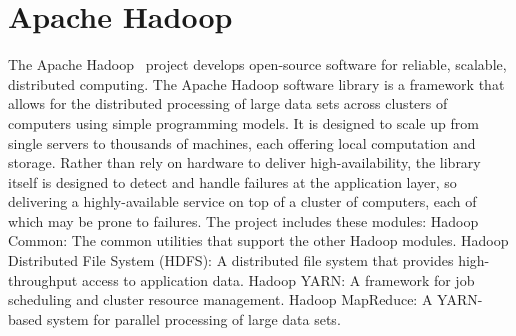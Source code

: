 \section{Apache Hadoop}

The Apache Hadoop~\cite{hid-sp18-515-www-hadoop} project develops
open-source software for reliable, scalable, distributed computing.
The Apache Hadoop software library is a framework that allows for the
distributed processing of large data sets across clusters of computers
using simple programming models. It is designed to scale up from
single servers to thousands of machines, each offering local
computation and storage. Rather than rely on hardware to deliver
high-availability, the library itself is designed to detect and handle
failures at the application layer, so delivering a highly-available
service on top of a cluster of computers, each of which may be prone
to failures.  The project includes these modules: Hadoop Common: The
common utilities that support the other Hadoop modules.  Hadoop
Distributed File System (HDFS): A distributed file system that
provides high-throughput access to application data.  Hadoop YARN: A
framework for job scheduling and cluster resource management.  Hadoop
MapReduce: A YARN-based system for parallel processing of large data
sets.
